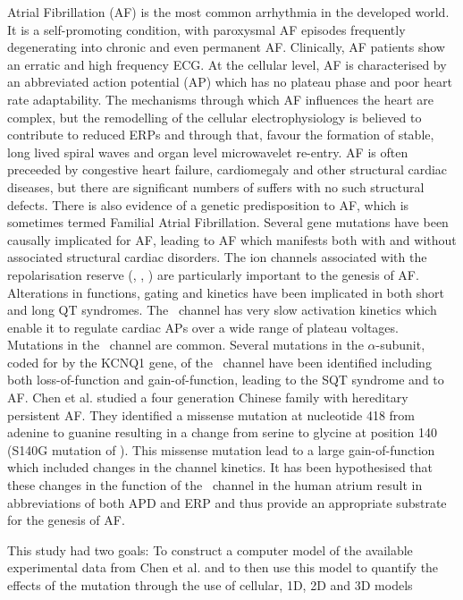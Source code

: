 Atrial Fibrillation (AF) is the most common arrhythmia in the developed world.
It is a self-promoting condition, with paroxysmal AF episodes frequently
degenerating into chronic and even permanent AF.
Clinically, AF patients show an erratic and high frequency ECG.
At the cellular level, AF is characterised by an abbreviated action potential
(AP) which has no plateau phase and poor heart rate adaptability.
The mechanisms through which AF influences the heart are complex, but the
remodelling of the cellular electrophysiology is believed to contribute to
reduced ERPs and through that, favour the formation of stable, long lived
spiral waves and organ level microwavelet re-entry.
AF is often preceeded by congestive heart failure, cardiomegaly and other
structural cardiac diseases, but there are significant numbers of suffers with
no such structural defects.
There is also evidence of a genetic predisposition to AF, which is sometimes
termed Familial Atrial Fibrillation.
Several gene mutations have been causally implicated for AF, leading to AF
which manifests both with and without associated structural cardiac disorders.
The ion channels associated with the repolarisation reserve (, ,
) are particularly important to the genesis of AF.
Alterations in functions, gating and kinetics have been implicated in both short
and long QT syndromes.
The \ channel has very slow activation kinetics which enable it to
regulate cardiac APs over a wide range of plateau voltages.
Mutations in the \ channel are common.
Several mutations in the $\alpha$-subunit, coded for by the KCNQ1 gene, of the
\ channel have been identified including both loss-of-function and
gain-of-function, leading to the SQT syndrome and to AF.
Chen et al. studied a four generation Chinese family with hereditary persistent
AF.
They identified a missense mutation at nucleotide 418 from adenine to guanine
resulting in a change from serine to glycine at position 140 (S140G mutation of
).
This missense mutation lead to a large gain-of-function which included changes
in the channel kinetics.
It has been hypothesised that these changes in the function of the \
channel in the human atrium result in abbreviations of both APD and ERP and thus
provide an appropriate substrate for the genesis of AF.

This study had two goals: To construct a computer model of the available
experimental data from Chen et al. and to then use this model to quantify the
effects of the mutation through the use of cellular, 1D, 2D and 3D models

